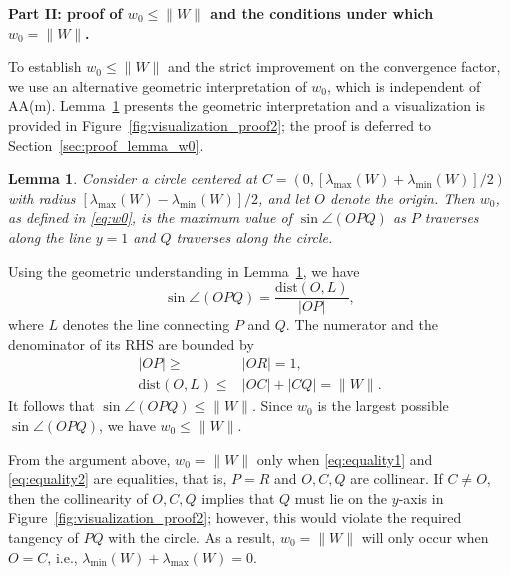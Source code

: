 \documentclass[11pt]{article}
\newtheorem{lemma}[theorem]{Lemma}
\newcommand{\dist}{\text{dist}}
\begin{document}
\textbf{Part II: proof of $w_0\leq \|W\|$ and the conditions under which $w_0 = \|W\|$.
} {To establish $w_0\leq \|W\|$ and the strict improvement on the convergence factor, we use an alternative geometric interpretation of $w_0$, which is independent of AA(m). 
Lemma~\ref{lemma:w0} presents the geometric interpretation and a visualization is provided in Figure~\ref{fig:visualization_proof2};
the proof is deferred to Section~\ref{sec:proof_lemma_w0}.  %

\begin{lemma}\label{lemma:w0}
Consider a circle centered at $C=(0,[\lambda_{\max}(W)+\lambda_{\min}(W)]/{2})$ with radius $[\lambda_{\max}(W)-\lambda_{\min}(W)]/{2}$, and let $O$ denote the origin. Then $w_0$, as defined in \eqref{eq:w0}, is the maximum value of $\sin\angle(OPQ)$ as $P$ traverses along the line $y=1$ and $Q$ traverses along the circle.
\end{lemma}

Using the geometric understanding in Lemma~\ref{lemma:w0}, we have 
\[
\sin \angle(OPQ)=\frac{\dist(O,L)}{|OP|},
\]
where $L$ denotes the line connecting $P$ and $Q$. The numerator and the denominator of its RHS are bounded by 
\begin{align}\label{eq:equality1}|OP|\geq& |OR|=1,\\\label{eq:equality2}\dist(O, L)\leq& |OC|+|CQ| =  \|W\|.\end{align} It follows that $\sin \angle(OPQ)\leq \|W\|$. Since $w_0$ is the largest possible $\sin \angle(OPQ)$, we have $w_0\leq \|W\|$. 

From the argument above,  $w_0 = \|W\|$ only when \eqref{eq:equality1} and \eqref{eq:equality2} are equalities, that is, $P=R$ and $O,C,Q$ are collinear. If $C\neq O$, then the collinearity of $O,C,Q$ implies that $Q$ must lie on the $y$-axis in Figure~\ref{fig:visualization_proof2}; however, this would violate the required tangency of $PQ$ with the circle. As a result, $w_0 = \|W\|$  will only occur when $O=C$, i.e., $\lambda_{\min}(W)+\lambda_{\max}(W)=0$. 

}
\end{document}
